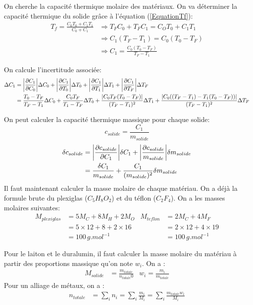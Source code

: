 \documentclass[12pt]{article}
\begin{document}
On cherche la capacité thermique molaire des matériaux. On va déterminer la capacité thermique du solide grâce à l'équation (\ref{EquationTf}):
\begin{align*}
T_f=\frac{C_0T_0+C_1T_1}{C_0+C_1} &\Rightarrow T_FC_0+T_FC_1=C_OT_0+C_1T_1 \\
&\Rightarrow C_1(T_F-T_1)=C_0(T_0-T_F) \\
&\Rightarrow C_1=\frac{C_0(T_0-T_F)}{T_F-T_1}
\end{align*}

On calcule l'incertitude associée:
\begin{align*}
\Delta C_1 &= \abs{\frac{\partial C_1}{\partial C_0}} \Delta C_0 + \abs{\frac{\partial C_1}{\partial T_0}} \Delta T_0 + \abs{\frac{\partial C_1}{\partial T_1}} \Delta T_1 + \abs{\frac{\partial C_1}{\partial T_F}} \Delta T_F \\
&= \frac{T_0-T_F}{T_F-T_1}\Delta C_0 + \frac{C_0T_F}{T_1-T_F}\Delta T_0 + \frac{\abs{C_0T_F(T_0-T_F)}}{(T_F-T_1)^2}\Delta T_1 + \frac{\abs{C_0((T_F-T_1)-T_1(T_0-T_F))}}{(T_F-T_1)^2}\Delta T_F
\end{align*}




On peut calculer la capacité thermique massique pour chaque solide:
\begin{equation}
c_{solide}=\frac{C_1}{m_{solide}}
\end{equation}
\begin{align*}
\delta c_{solide}&=\abs{\frac{\partial c_{solide}}{\partial C_1}}\delta C_1 + \abs{\frac{\partial c_{solide}}{m_{solide}}}\delta m_{solide} \\
&=\frac{\delta C_1}{m_{solide}}+ \frac{C_1}{(m_{solide})^2}\delta m_{solide}
\end{align*}
Il faut maintenant calculer la masse molaire de chaque matériau. On a déjà la formule brute du plexiglas ($C_5H_8O_2$) et du téflon ($C_2F_4$). On a les masses molaires suivantes:
\begin{align*}
M_{plexiglas}&=5M_C+8M_H+2M_O & M_{teflon}&=2M_C+4M_F  \\
&=5\times 12+8+2\times 16 & &=2\times 12+4\times 19 \\
&=100\, g.mol^{-1} & &=100\, g.mol^{-1}
\end{align*}

Pour le laiton et le duralumin, il faut calculer la masse molaire du matériau à partir des proportions massique qu'on note $w_{i}$. On a :
\begin{align*}
M_{solide}&=\frac{m_{totale}}{n_{totale}0} & w_i=\frac{m_i}{m_{totale}}
\end{align*} 
Pour un alliage de métaux, on a :
\begin{align*}
n_{totale}&=\sum_{i}n_i
=\sum_i \frac{m_i}{M_i}
=\sum_i \frac{m_{totale}w_i}{M_i}
\end{align*}
\end{document}
